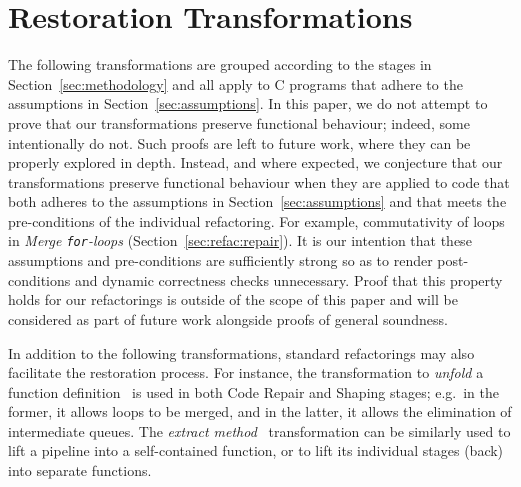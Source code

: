 \section{Restoration Transformations} \label{sec:refactoring}

%
The following transformations are grouped according to the stages in Section~\ref{sec:methodology} and all  apply to C programs that adhere to the assumptions in Section~\ref{sec:assumptions}.
%
In this paper, we do not attempt to prove that our transformations preserve functional behaviour; indeed, some intentionally do not. Such proofs are left to future work, where they can be properly explored in depth. Instead, and where expected, we conjecture that our transformations preserve functional behaviour when they are applied to code that both adheres to the assumptions in Section~\ref{sec:assumptions} and that meets the pre-conditions of the individual refactoring. For example, commutativity of loops in \emph{Merge \lstinline|for|-loops} (Section~\ref{sec:refac:repair}). It is our intention that these assumptions and pre-conditions are sufficiently strong so as to render post-conditions and dynamic correctness checks unnecessary. Proof that this property holds for our refactorings is outside of the scope of this paper and will be considered as part of future work alongside proofs of general soundness.

In addition to the following transformations, standard refactorings may also facilitate the restoration process. For instance, the transformation to \emph{unfold} a function definition~\cite{darlington77} is used in both Code Repair and Shaping stages; e.g.\ in the former, it allows loops to be merged, and in the latter, it allows the elimination of intermediate queues. The \emph{extract method}~\cite{DBLP:books/daglib/0019908} transformation can be similarly used to lift a pipeline into a self-contained function, or to lift its individual stages (back) into separate functions.
%


